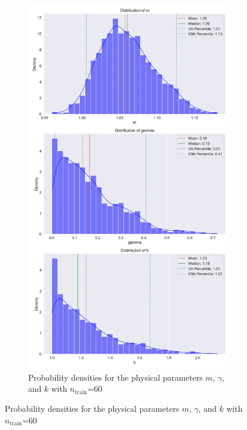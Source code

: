 \documentclass{article}
\newcommand{\nt}{$n_\text{train}$}
\begin{document}
\begin{figure}[htbp!]
    \centering
    \begin{subfigure}[b]{0.45\textwidth}
        \centering
        \includegraphics[width=\textwidth]{plots/BPINN/oscilator1_60_[20, 20, 1]_combined_distribution.png}
        \caption{Probability densities for the physical parameters \( m \), \( \gamma  \), and \( k \) with \nt=60}
        \label{fig:plot1}
    \end{subfigure}

\end{figure}
\end{document}
